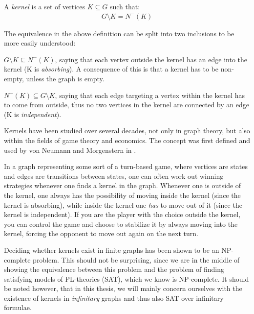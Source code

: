 \begin{definition}
  A \textit{kernel} is a set of vertices $K \subseteq G$ such that:
  \begin{align}
    G \setminus K = N^-(K)
  \end{align}
\end{definition}
The equivalence in the above definition can be split into two inclusions to be more easily understood:

$G \setminus K \subseteq N^-(K)$, saying that each vertex outside the kernel has an edge into the kernel (K is \textit{absorbing}).
A consequence of this is that a kernel has to be non-empty, unless the graph is empty.

$N^-(K) \subseteq G \setminus K$, saying that each edge targeting a vertex within the kernel has to come from outside, thus no two vertices in the kernel are connected by an edge (K is \textit{independent}).

Kernels have been studied over several decades, not only in graph theory, but also within the fields of game theory and economics.
The concept was first defined and used by von Neumann and Morgenstern in \cite{neumann}.

In a graph representing some sort of a turn-based game, where vertices are states and edges are transitions between states, one can often work out winning strategies whenever one finds a kernel in the graph.
Whenever one is outside of the kernel, one always has the possibility of moving inside the kernel (since the kernel is absorbing), while inside the kernel one \textit{has} to move out of it (since the kernel is independent).
If you are the player with the choice outside the kernel, you can control the game and choose to stabilize it by always moving into the kernel, forcing the opponent to move out again on the next turn.

Deciding whether kernels exist in finite graphs has been shown to be an NP-complete problem\cite{chvatal}.
This should not be surprising, since we are in the middle of showing the equivalence between this problem and the problem of finding satisfying models of PL-theories (SAT), which we know is NP-complete.
It should be noted however, that in this thesis, we will mainly concern ourselves with the existence of kernels in \textit{infinitary} graphs and thus also SAT over infinitary formulae.

